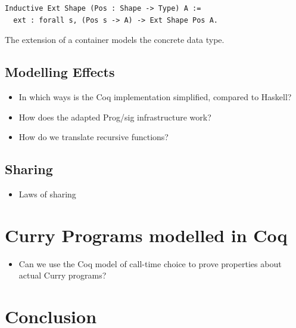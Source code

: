 \documentclass[a4paper, 11pt, fleqn, twoside]{scrreprt}
\begin{document}
\begin{verbatim}
Inductive Ext Shape (Pos : Shape -> Type) A := 
  ext : forall s, (Pos s -> A) -> Ext Shape Pos A.
\end{verbatim}

The extension of a container models the concrete data type.

\section{Modelling Effects}
\begin{itemize}
\item In which ways is the Coq implementation simplified, compared to Haskell?
\item How does the adapted Prog/sig infrastructure work?
\item How do we translate recursive functions?
\end{itemize}

\section{Sharing}
\label{sec:lawsOfSharing}
\begin{itemize}
\item Laws of sharing
\end{itemize}

\chapter{Curry Programs modelled in Coq}
\begin{itemize}
\item Can we use the Coq model of call-time choice to prove properties about actual Curry programs?
\end{itemize}

\chapter{Conclusion}



\appendix
\end{document}
